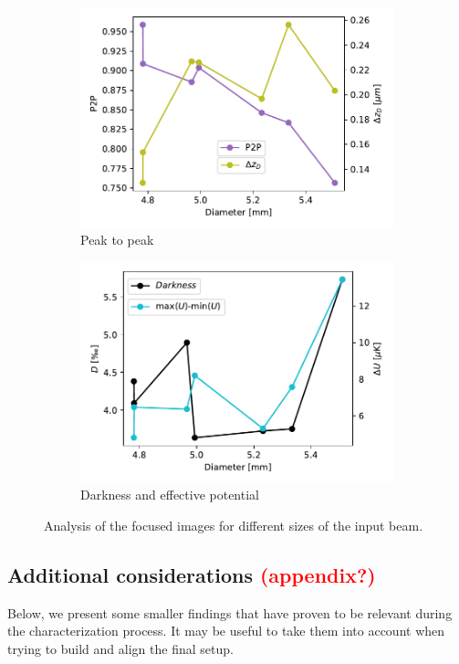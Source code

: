 \begin{figure}
    \begin{subfigure}{0.5\textwidth}
        \includegraphics[width=\textwidth]{chapters/chapter_3/figures/p2p.pdf}
        \caption{Peak to peak}
    \end{subfigure}
    \begin{subfigure}{0.5\textwidth}
        \includegraphics[width=\textwidth]{chapters/chapter_3/figures/darkenss.pdf}
        \caption{Darkness and effective potential}
        \label{fig:diam_dark}
    \end{subfigure}
    \caption{Analysis of the focused images for different sizes of the input beam.}
    \label{fig:analysis_diam}
\end{figure}

\subsection{Additional considerations \textcolor{red}{(appendix?)}}
Below, we present some smaller findings that have proven to be relevant during the characterization process. It may be useful to take them into account when trying to build and align the final setup.

